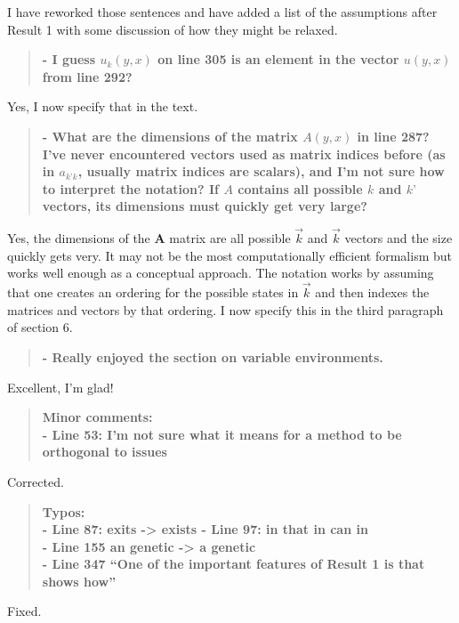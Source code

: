 \documentclass[10pt,parskip=full,foldmarks=off,addrfield=off,backaddress=false,refline=dateleft,letterpaper]{scrlttr2}
\newenvironment{reviewerquote}{\begin{quote}\color{DarkBlue}\bfseries}{\end{quote}}
\begin{document}
\begin{letter}
I have reworked those sentences and have added a list of the assumptions after Result 1 with some discussion of how they might be relaxed.

\begin{reviewerquote}
  - I guess $u_k(y,x)$ on line 305 is an element in the vector $u(y,x)$ from line 292?
\end{reviewerquote}

Yes, I now specify that in the text.

\begin{reviewerquote}
  - What are the dimensions of the matrix $A(y,x)$ in line 287? I’ve never encountered vectors used as matrix indices before (as in $a_{k’k}$, usually matrix indices are scalars), and I’m not sure how to interpret the notation? If $A$ contains all possible $k$ and $k’$ vectors, its dimensions must quickly get very large?
\end{reviewerquote}

Yes, the dimensions of the $\mathbf{A}$ matrix are all possible $\vec{k}$ and $\vec{k}$ vectors and the size quickly gets very. It may not be the most computationally efficient formalism but works well enough as a conceptual approach. The notation works by assuming that one creates an ordering for the possible states in $\vec{k}$ and then indexes the matrices and vectors by that ordering. I now specify this in the third paragraph of section 6.

\begin{reviewerquote}
  - Really enjoyed the section on variable environments.
\end{reviewerquote}

Excellent, I'm glad!

\begin{reviewerquote}
Minor comments:\\
- Line 53: I’m not sure what it means for a method to be orthogonal to issues
\end{reviewerquote}

Corrected.

\begin{reviewerquote}
Typos:\\
- Line 87: exits -> exists
- Line 97: in that in can in\\
- Line 155 an genetic -> a genetic\\
- Line 347 “One of the important features of Result 1 is that shows how”
\end{reviewerquote}

Fixed.


\end{letter}
\end{document}

